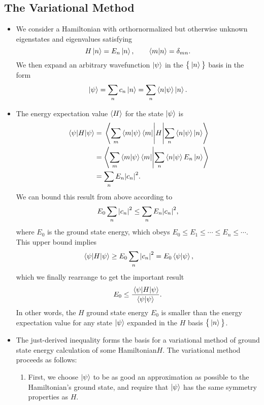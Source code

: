 \documentclass[11pt, a4paper]{article}
\newcommand{\Ham}{Hamiltonian\xspace}
\newcommand{\p}{\psi}  %
\begin{document}
\subsection{The Variational Method}
\begin{itemize}
    \item We consider a \Ham with orthornormalized but otherwise unknown eigenstates and eigenvalues satisfying
    \begin{equation*}
        H \ket{n} = E_{n}\ket{n}, \qquad \braket{m}{n} = \delta_{mn}.
    \end{equation*}
    We then expand an arbitrary wavefunction $ \ket{\psi} $ in the $ \big\{ \ket{n} \big\} $ basis in the form
    \begin{equation*}
        \ket{\psi} = \sum_{n} c_{n}\ket{n} = \sum_{n} \braket{n}{\p}\ket{n}.
    \end{equation*}
    
    \item The energy expectation value $ \ev{H} $ for the state $ \ket{\psi} $ is
    \begin{align*}
        \mel{\psi}{H}{\psi} &= \mel{\sum_{m} \braket{m}{\p}\bra{m}}{H}{\sum_{n} \braket{n}{\p}\ket{n}}\\
        & = \braket{\sum_{m} \braket{m}{\p}\bra{m}}{\sum_{n} \braket{n}{\p}E_{n}\ket{n}}\\
        &= \sum_{n} E_{n}\abs{c_{n}}^{2}.
    \end{align*}
    We can bound this result from above according to
    \begin{equation*}
        E_{0}\sum_{n} \abs{c_{n}}^{2} \leq \sum_{n} E_{n}\abs{c_{n}}^{2},
    \end{equation*}
    where $ E_{0} $ is the ground state energy, which obeys $ E_{0} \leq E_{1} \leq \cdots \leq E_{n} \leq \cdots $. This upper bound implies
    \begin{equation*}
        \mel{\psi}{H}{\psi} \geq E_{0} \sum_{n}\abs{c_{n}}^{2} = E_{0} \braket{\psi}{\psi},
    \end{equation*}
    which we finally rearrange to get the important result
    \begin{equation*}
        E_{0} \leq \frac{\mel{\psi}{H}{\psi}}{\braket{\psi}{\psi}}.
    \end{equation*}
    In other words, the $ H $ ground state energy $ E_{0} $ is smaller than the energy expectation value for any state $ \ket{\psi} $ expanded in the $ H $ basis $ \big\{ \ket{n} \big\} $.
    
    \item The just-derived inequality forms the basis for a variational method of ground state energy calculation of some \Ham $ H $. The variational method proceeds as follows:
    \begin{enumerate}
        \item First, we choose $ \ket{\psi} $ to be as good an approximation as possible to the \Ham's ground state, and require that $ \ket{\psi} $ has the same symmetry properties as $ H $. 


\end{enumerate}
\end{itemize}
\end{document}
